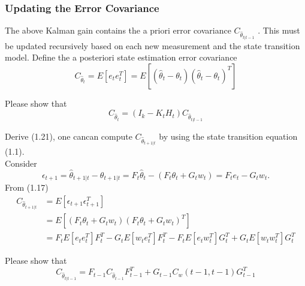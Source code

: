 \documentclass[a4 paper]{article}
\begin{document}
\subsubsection{Updating the Error Covariance } 
The above Kalman gain contains the a priori error covariance $C_{\hat{\theta}_{t|t-1}}$ . This must be updated recursively based on each new measurement and the state transition model. 
Define the a posteriori state estimation error covariance
\begin{equation}
    C_{\hat{\theta}_{t}}=E[e_{t}e_t^T]=E[(\hat{\theta}_{t}-\theta_t)(\hat{\theta}_{t}-\theta_t)^T]
\end{equation}
\begin{tcolorbox}[colback=RubineRed!5!white,colframe=RubineRed!75!black]
Please show that 
\begin{equation}
    C_{\hat{\theta}_{t}}=(I_k-K_tH_t)C_{\hat{\theta}_{t|t-1}}
\end{equation}
\end{tcolorbox}
Derive (1.21), one cancan compute $C_{\hat{\theta}_{t+1|t}}$ by using the state transition equation (1.1).\\
Consider
\begin{equation}
\epsilon_{t+1}=\hat{\theta}_{t+1|t}-\theta_{t+1|t}=F_t\hat{\theta}_t-(F_t\theta_t+G_t{w}_t)=F_{t}e_t-G_{t}w_t.
\end{equation}
From (1.17)
\begin{equation}
\begin{split}
    C_{\hat{\theta}_{t+1|t}}&=E[\epsilon_{t+1}\epsilon_{t+1}^T]\\
    &=E[(F_{t}\theta_t+G_tw_t)(F_{t}\theta_t+G_tw_t)^T]\\
    &=F_tE[e_te_t^T]F_t^T-G_tE[w_te_t^T]F_t^T-F_tE[e_tw_t^T]G_t^T+G_tE[w_tw_t^T]G_t^T
\end{split}
\end{equation}
\begin{tcolorbox}[colback=RubineRed!5!white,colframe=RubineRed!75!black]
Please show that 
\begin{equation}
     C_{\hat{\theta}_{t|t-1}}=F_{t-1} C_{\hat{\theta}_{t-1}}F_{t-1}^T+G_{t-1}C_{w}(t-1,t-1)G_{t-1}^T
\end{equation}
\end{tcolorbox}
\end{document}
